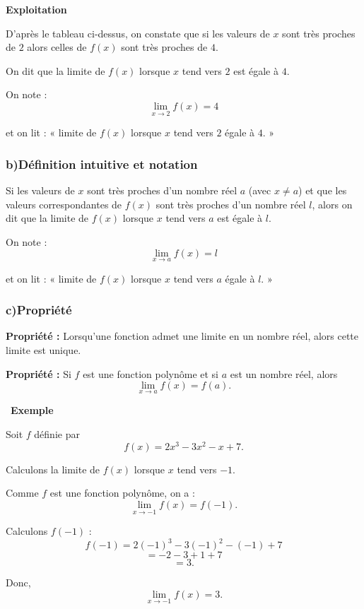 \documentclass[12pt,a4paper]{article}
\begin{document}
\bigskip

\begin{center}
\textbf{Exploitation}
\end{center}

D’après le tableau ci-dessus, on constate que si les valeurs de $x$ sont très proches de $2$ alors celles de $f(x)$ sont très proches de $4$.

On dit que la limite de $f(x)$ lorsque $x$ tend vers $2$ est égale à $4$.

On note :
\[
\lim_{x \to 2} f(x)=4
\]

et on lit : « limite de $f(x)$ lorsque $x$ tend vers $2$ égale à $4$. »

\subsubsection*{b)\quad Définition intuitive et notation}

Si les valeurs de $x$ sont très proches d’un nombre réel $a$ (avec $x \neq a$) et que les valeurs correspondantes de $f(x)$ sont très proches d’un nombre réel $l$, alors on dit que la limite de $f(x)$ lorsque $x$ tend vers $a$ est égale à $l$.

On note :
\[
\lim_{x \to a} f(x) = l
\]

et on lit : « limite de $f(x)$ lorsque $x$ tend vers $a$ égale à $l$. »

\bigskip


\subsubsection*{c)\quad Propriété}
\textbf{Propriété :} Lorsqu’une fonction admet une limite en un nombre réel, alors cette limite est unique.

\textbf{Propriété :} 
Si $f$ est une fonction polynôme et si $a$ est un nombre réel, alors
\[
\lim_{x\to a} f(x)=f(a).
\]

\bigskip

\checkmark\ \textbf{Exemple}

Soit $f$ définie par 
\[
f(x)=2x^3-3x^2-x+7.
\]

Calculons la limite de $f(x)$ lorsque $x$ tend vers $-1$.

Comme $f$ est une fonction polynôme, on a :
\[
\lim_{x\to -1} f(x)=f(-1).
\]

Calculons $f(-1)$ :
\[
f(-1)=2(-1)^3-3(-1)^2-(-1)+7
\]
\[
= -2 - 3 + 1 + 7
\]
\[
= 3.
\]

Donc,
\[
\boxed{\lim_{x\to -1} f(x)=3.}
\]
\end{document}
